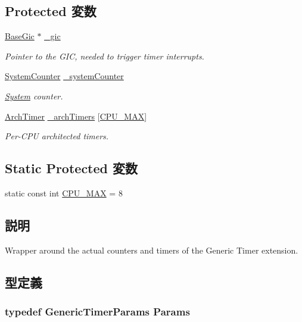 \subsection*{Protected 変数}
\begin{DoxyCompactItemize}
\item 
\hyperlink{classBaseGic}{BaseGic} $\ast$ \hyperlink{classGenericTimer_a3e5f959a7b42b68c04c24579d7694403}{\_\-gic}
\begin{DoxyCompactList}\small\item\em Pointer to the GIC, needed to trigger timer interrupts. \item\end{DoxyCompactList}\item 
\hyperlink{classGenericTimer_1_1SystemCounter}{SystemCounter} \hyperlink{classGenericTimer_afd7c96638f55784d1c67600fe458440b}{\_\-systemCounter}
\begin{DoxyCompactList}\small\item\em \hyperlink{classSystem}{System} counter. \item\end{DoxyCompactList}\item 
\hyperlink{classGenericTimer_1_1ArchTimer}{ArchTimer} \hyperlink{classGenericTimer_af68f66e102b05b60384be22f871c89ec}{\_\-archTimers} \mbox{[}\hyperlink{classGenericTimer_a4b102c882c8ecd5172c3f918fcde9c6d}{CPU\_\-MAX}\mbox{]}
\begin{DoxyCompactList}\small\item\em Per-\/CPU architected timers. \item\end{DoxyCompactList}\end{DoxyCompactItemize}
\subsection*{Static Protected 変数}
\begin{DoxyCompactItemize}
\item 
static const int \hyperlink{classGenericTimer_a4b102c882c8ecd5172c3f918fcde9c6d}{CPU\_\-MAX} = 8
\end{DoxyCompactItemize}


\subsection{説明}
Wrapper around the actual counters and timers of the Generic Timer extension. 

\subsection{型定義}
\hypertarget{classGenericTimer_a22b88e736eb537a678104e1f9d03b967}{
\subsubsection[{Params}]{\setlength{\rightskip}{0pt plus 5cm}typedef GenericTimerParams {\bf Params}}}
\label{classGenericTimer_a22b88e736eb537a678104e1f9d03b967}


